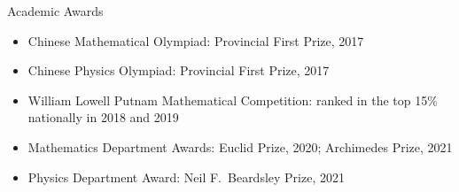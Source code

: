 \documentclass{resume}
\begin{document}
\begin{rSection}{Academic Awards}
\begin{itemize}
    \item Chinese Mathematical Olympiad: Provincial First Prize, 2017
    \item Chinese Physics Olympiad: Provincial First Prize, 2017
    \item William Lowell Putnam Mathematical Competition: ranked in the top 15\% nationally in 2018 and 2019
    \item Mathematics Department Awards: Euclid Prize, 2020; Archimedes Prize, 2021
    \item Physics Department Award: Neil F.\ Beardsley Prize, 2021
\end{itemize}
\end{rSection}
\end{document}

